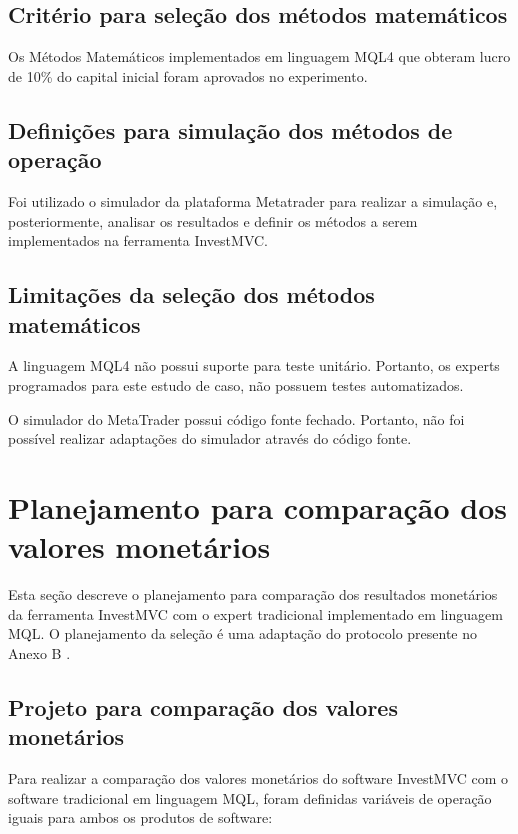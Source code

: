 \subsection{Critério para seleção dos métodos matemáticos}

Os Métodos Matemáticos implementados em linguagem MQL4 que obteram lucro de 10\% do capital inicial foram aprovados no experimento.

\subsection{Definições para simulação dos métodos de operação}

Foi utilizado o simulador da plataforma Metatrader para realizar a simulação e, posteriormente, analisar os resultados e definir os métodos a serem implementados na ferramenta InvestMVC.

\subsection{Limitações da seleção dos métodos matemáticos}

A linguagem MQL4 não possui suporte para teste unitário. Portanto, os experts programados para este estudo de caso, não possuem testes automatizados.

O simulador do MetaTrader possui código fonte fechado. Portanto, não foi possível realizar adaptações do simulador através do código fonte.


\section{Planejamento para comparação dos valores monetários}

Esta seção descreve o planejamento para comparação dos resultados monetários da ferramenta InvestMVC com o expert tradicional implementado em linguagem MQL. O planejamento da seleção é uma adaptação do protocolo presente no Anexo B \cite{brereton}.

\subsection{Projeto para comparação dos valores monetários}

Para realizar a comparação dos valores monetários do software InvestMVC com o software tradicional em linguagem MQL, foram definidas variáveis de operação iguais para ambos os produtos de software:


